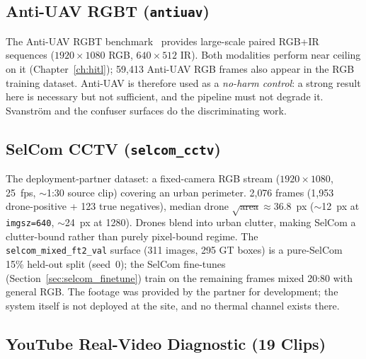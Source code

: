 \subsection{Anti-UAV RGBT (\texttt{antiuav})}
\label{sec:ds_antiuav}

The Anti-UAV RGBT benchmark~\cite{jiang2021antiuav,zhao2023antiuav} provides large-scale paired RGB+IR sequences ($1920{\times}1080$ RGB, $640{\times}512$ IR). Both modalities perform near ceiling on it (Chapter~\ref{ch:hitl}); 59{,}413 Anti-UAV RGB frames also appear in the RGB training dataset. Anti-UAV is therefore used as a \emph{no-harm control}: a strong result here is necessary but not sufficient, and the pipeline must not degrade it. Svanstr\"om and the confuser surfaces do the discriminating work.

\subsection{SelCom CCTV (\texttt{selcom\_cctv})}
\label{sec:ds_selcom}

The deployment-partner dataset: a fixed-camera RGB stream ($1920{\times}1080$, 25~fps, $\sim$1:30 source clip) covering an urban perimeter. 2{,}076 frames (1{,}953 drone-positive + 123 true negatives), median drone $\sqrt{\text{area}} \approx 36.8$~px ($\sim$12~px at \texttt{imgsz=640}, $\sim$24~px at 1280). Drones blend into urban clutter, making SelCom a clutter-bound rather than purely pixel-bound regime. The \texttt{selcom\_mixed\_ft2\_val} surface (311 images, 295 GT boxes) is a pure-SelCom 15\% held-out split (seed~0); the SelCom fine-tunes (Section~\ref{sec:selcom_finetune}) train on the remaining frames mixed 20:80 with general RGB. The footage was provided by the partner for development; the system itself is not deployed at the site, and no thermal channel exists there.

\subsection{YouTube Real-Video Diagnostic (19 Clips)}
\label{sec:ds_youtube}

